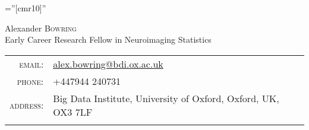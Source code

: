 \documentclass[a4paper,10pt]{article}
\begin{document}

\pagestyle{empty} %

\font\fb=''[cmr10]'' %

\par{\centering
		{\Huge Alexander \textsc{Bowring} \\
		\normalsize \color{Red}Early Career Research Fellow in Neuroimaging Statistics
	}\bigskip\par}

\begin{center}
\begin{tabular}{rl}
	\textsc{email:}     & \href{mailto:alex.bowring@bdi.ox.ac.uk}{alex.bowring@bdi.ox.ac.uk}\\
	\textsc{phone:} & +447944 240731\\
	\textsc{address:} & Big Data Institute, University of Oxford, Oxford, UK, OX3 7LF \\
    \\
\end{tabular}
\end{center}




\end{document}
